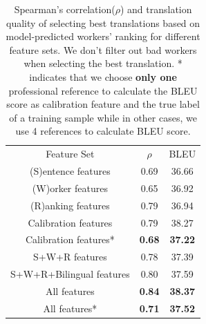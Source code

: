 \documentclass[11pt,letterpaper]{article}
\begin{document}
 
 
 \begin{table}[h]
 \center
\begin{tabular}{c|c|c}
\hline
Feature Set             & $\rho$  & BLEU  \\ \hhline{===}
(S)entence features     & 0.69 & 36.66 \\
(W)orker features       & 0.65 & 36.92 \\
(R)anking features      & 0.79 & 36.94 \\
Calibration features  & 0.79 & 38.27 \\
Calibration features* & \textbf{0.68} & \textbf{37.22} \\
S+W+R features          & 0.78 & 37.39 \\
S+W+R+Bilingual features        & 0.80 & 37.59 \\
All features            & \textbf{0.84} & \textbf{38.37} \\
All features*            & \textbf{0.71} & \textbf{37.52} \\ \hline
\end{tabular}
\caption{\label{lrresult} Spearman's correlation($\rho$) and translation quality of selecting best translations based on model-predicted workers' ranking for different feature sets. We don't filter out bad workers when selecting the best translation. * indicates that  we choose \textbf{only one} professional reference to calculate the BLEU score as calibration feature and the true label of a training sample while in other cases, we use 4 references to calculate BLEU score. }
\end{table}
\end{document}
